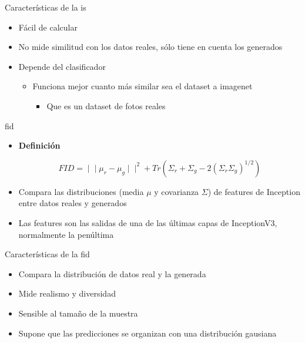 \begin{frame}{Características de la \gls{is} \cite{salimans2016improved}}
\begin{itemize}
    \item \alert{Fácil de calcular}
    \item No mide \alert{similitud} con los datos reales, sólo tiene en cuenta los generados
    \item \alert{Depende del clasificador}
    \begin{itemize}
        \item Funciona mejor cuanto más similar sea el dataset a imagenet
        \begin{itemize}
            \item Que es un dataset de fotos reales
        \end{itemize}
    \end{itemize}
\end{itemize}
\end{frame}

\begin{frame}{\gls{fid} \cite{heusel2017gans}}
\begin{itemize}
    \item \alert{\textbf{Definición}}

    \begin{equation}
        FID=∣∣\mu_r −\mu_g ∣∣^2+Tr(\Sigma_r +\Sigma_g −2(\Sigma_r \Sigma_g )^{1/2})
    \end{equation}

    \item Compara las \alert{distribuciones} (media $\mu$ y covarianza $\Sigma$) de features de Inception entre datos reales y generados
    \item Las features son las salidas de una de \alert{las últimas capas} de InceptionV3, normalmente la penúltima
\end{itemize}
\end{frame}

\begin{frame}{Características de la \gls{fid} \cite{heusel2017gans}}
\begin{itemize}
    \item Compara la \alert{distribución de datos real} y la \alert{generada}
    \item Mide \alert{realismo y diversidad}
    \item Sensible al tamaño de la muestra
    \item Supone que las predicciones se organizan con una \alert{distribución gausiana}
\end{itemize}
\end{frame}


